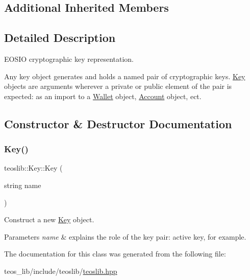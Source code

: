 \subsection*{Additional Inherited Members}


\subsection{Detailed Description}
E\+O\+S\+IO cryptographic key representation. 

Any key object generates and holds a named pair of cryptographic keys. \mbox{\hyperlink{classteoslib_1_1_key}{Key}} objects are arguments wherever a private or public element of the pair is expected\+: as an import to a \mbox{\hyperlink{classteoslib_1_1_wallet}{Wallet}} object, \mbox{\hyperlink{classteoslib_1_1_account}{Account}} object, ect. 

\subsection{Constructor \& Destructor Documentation}
\mbox{\label{classteoslib_1_1_key_a7c296035add9fcd2fee9fbbf118df3a7}} 
\subsubsection{\texorpdfstring{Key()}{Key()}}
{\footnotesize\ttfamily teoslib\+::\+Key\+::\+Key (\begin{DoxyParamCaption}\item[{string}]{name }\end{DoxyParamCaption})\hspace{0.3cm}{\ttfamily [inline]}}



Construct a new \mbox{\hyperlink{classteoslib_1_1_key}{Key}} object. 


\begin{DoxyParams}{Parameters}
{\em name} & explains the role of the key pair\+: {\ttfamily active key}, for example. \\
\hline
\end{DoxyParams}


The documentation for this class was generated from the following file\+:\begin{DoxyCompactItemize}
\item 
teos\+\_\+lib/include/teoslib/\mbox{\hyperlink{teoslib_8hpp}{teoslib.\+hpp}}\end{DoxyCompactItemize}

